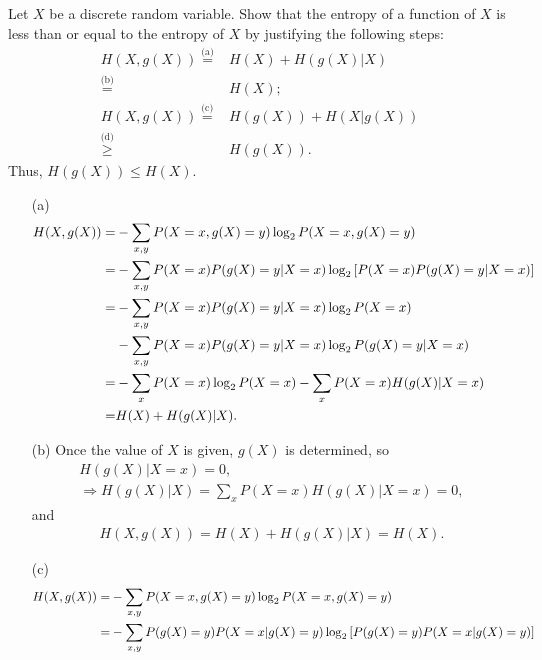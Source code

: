 \documentclass{assignment}
\begin{document}
\begin{prob}
    Let $X$ be a discrete random variable. Show that the entropy of a function of $X$ is less than or equal to the entropy of $X$ by justifying the following steps:
    \begin{align*}
        H(X,g(X))\overset{\text{(a)}}{=}&H(X)+H(g(X)\vert X)\\
        \overset{\text{(b)}}{=}&H(X);\\
        H(X,g(X))\overset{\text{(c)}}{=}&H(g(X))+H(X\vert g(X))\\
        \overset{\text{(d)}}{\geq}&H(g(X)).
    \end{align*}
    Thus, $H(g(X))\leq H(X)$.
\end{prob}
\begin{pf}
    \begin{itemize}
        \item[(a)] 
        \begin{align}
            \notag H(X,g(X))=&-\sum_{x,y}P(X=x,g(X)=y)\log_2P(X=x,g(X)=y)\\
            \notag=&-\sum_{x,y}P(X=x)P(g(X)=y\vert X=x)\log_2\left[P(X=x)P(g(X)=y\vert X=x)\right]\\
            \notag=&-\sum_{x,y}P(X=x)P(g(X)=y\vert X=x)\log_2P(X=x)\\
            \notag&-\sum_{x,y}P(X=x)P(g(X)=y\vert X=x)\log_2P(g(X)=y\vert X=x)\\
            \notag=&-\sum_xP(X=x)\log_2P(X=x)-\sum_xP(X=x)H(g(X)\vert X=x)\\
            \notag=&H(X)+H(g(X)\vert X).
        \end{align}
        \item[(b)] Once the value of $X$ is given, $g(X)$ is determined, so
        \begin{gather}
            H(g(X)\vert X=x)=0,\\
            \Longrightarrow H(g(X)\vert X)=\sum_xP(X=x)H(g(X)\vert X=x)=0,
        \end{gather}
        and
        \begin{align}
            H(X,g(X))=H(X)+H(g(X)\vert X)=H(X).
        \end{align}
        \item[(c)] 
        \begin{align}
            \notag H(X,g(X))=&-\sum_{x,y}P(X=x,g(X)=y)\log_2P(X=x,g(X)=y)\\
            \notag=&-\sum_{x,y}P(g(X)=y)P(X=x\vert g(X)=y)\log_2\left[P(g(X)=y)P(X=x\vert g(X)=y)\right]\\

\end{align}
\end{itemize}
\end{pf}
\end{document}

